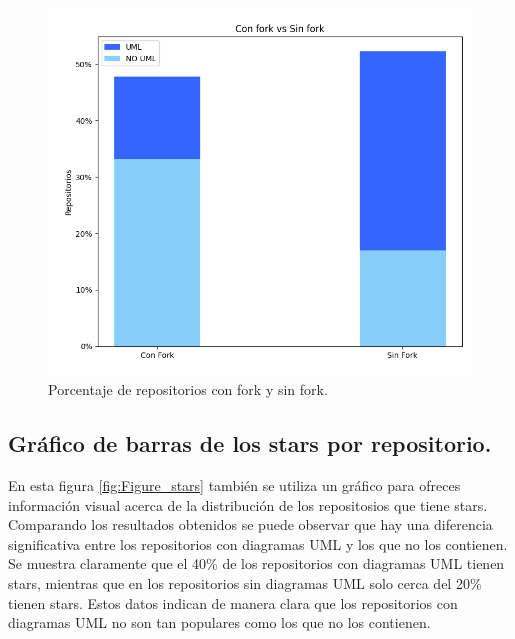 \documentclass[a4paper, 12pt]{book}
\begin{document}
\begin{figure}
  \centering
  \includegraphics[width=12cm, keepaspectratio]{img/Figure_fork.png}
  \caption{Porcentaje de repositorios con fork y sin fork.}\label{fig:Figure_fork}
\end{figure}


\subsection{Gráfico de barras de los stars por repositorio.}
\label{sec:Gráfico de barras de los stars por repositorio}
En esta figura \ref{fig:Figure_stars} también se utiliza un gráfico para ofreces información visual acerca de la distribución de los repositosios que tiene stars. 
Comparando los resultados obtenidos se puede observar que hay una diferencia significativa entre los repositorios con diagramas UML y los que no los contienen.
Se muestra claramente que el 40\% de los repositorios con diagramas UML tienen stars, mientras que en los repositorios sin diagramas UML solo cerca del 20\% tienen stars.
Estos datos indican de manera clara que los repositorios con diagramas UML no son tan populares como los que no los contienen.
\end{document}
